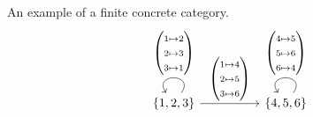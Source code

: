 \documentclass[12pt,compress]{beamer}
\begin{document}
\begin{frame}[fragile]
An example of a finite concrete category.
\[
\begin{tikzcd}
{\{1,2,3\}} \arrow["\begin{pmatrix} 1\mapsto 2 \\ 2\mapsto 3\\ 3\mapsto 1\end{pmatrix}"', loop, distance=2em, in=125, out=55] \arrow[rr, "\begin{pmatrix} 1\mapsto 4 \\ 2\mapsto 5\\ 3\mapsto 6\end{pmatrix}"] &  & {\{4,5,6\}} \arrow["\begin{pmatrix} 4\mapsto 5 \\ 5\mapsto 6\\ 6\mapsto 4\end{pmatrix}"', loop, distance=2em, in=125, out=55]
\end{tikzcd}
\]
\end{frame}
\end{document}
